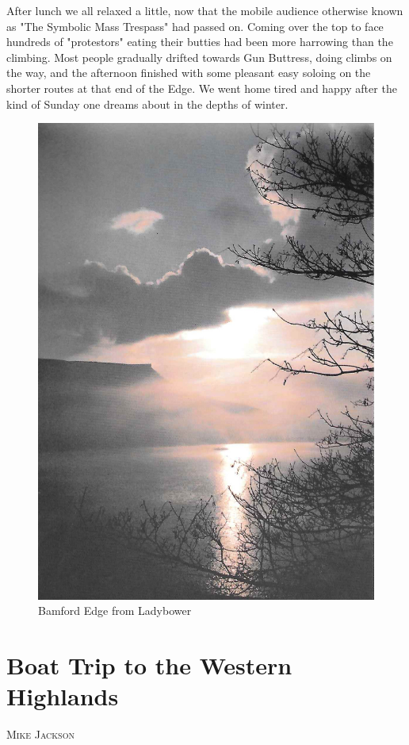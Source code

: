 \documentclass[a5paper,openany,font 10pt]{scrbook}
\makeatletter
\newcommand{\chapterauthor}[1]{%
{\parindent0pt\vspace*{-5pt}%
\linespread{1.1}\large\scshape#1%
\par\nobreak\vspace*{35pt}}
\@afterheading%
}
\makeatother
\begin{document}
After lunch we all relaxed a little, now that the mobile audience
otherwise known as "The Symbolic Mass Trespass" had passed on. Coming
over the top to face hundreds of "protestors" eating their butties had
been more harrowing than the climbing.  Most people gradually drifted
towards Gun Buttress, doing climbs on the way, and the afternoon
finished with some pleasant easy soloing on the shorter routes at that
end of the Edge.  We went home tired and happy after the kind of
Sunday one dreams about in the depths of winter.
\begin{figure}[htb]
\centering
\includegraphics[width=.9\linewidth]{./images/Bamford_Edge_from_Ladybower.jpg}
\caption{\label{fig:orge1c1de0}
Bamford Edge from Ladybower}
\end{figure}

\chapter{Boat Trip to the Western Highlands}
\label{sec:org1192d67}
\chapterauthor{Mike Jackson}
\end{document}
